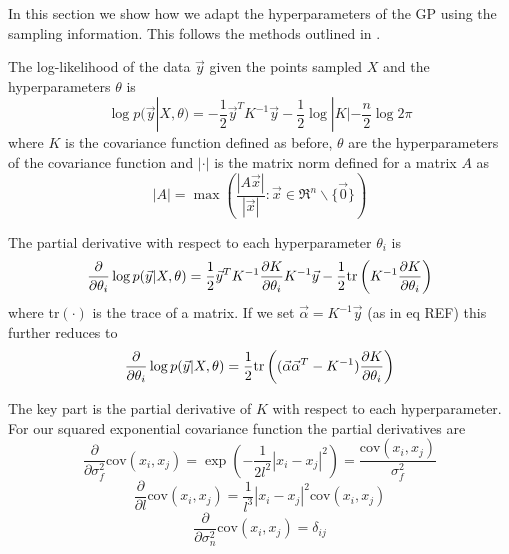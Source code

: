 \documentclass[phd,tocprelim]{cornell}
\begin{document}
In this section we show how we adapt the hyperparameters of the GP using the sampling information. This follows the methods outlined in \cite{RW}.

The log-likelihood of the data $\vec{y}$ given the points sampled $X$ and the hyperparameters $\theta$ is
\begin{equation}
    \log p(\vec{y}|X, \theta) = -\frac{1}{2}\vec{y}^{T}K^{-1}\vec{y} - \frac{1}{2}\log|K| - \frac{n}{2} \log 2\pi
\end{equation}
where $K$ is the covariance function defined as before, $\theta$ are the hyperparameters of the covariance function and $|\cdot|$ is the matrix norm defined for a matrix $A$ as
\begin{equation}
    |A| = \max \left( \frac{|A\vec{x}|}{|\vec{x}|} : \vec{x} \in \Re^{n}\backslash\{\vec{0}\} \right)
\end{equation}

The partial derivative with respect to each hyperparameter $\theta_{i}$ is
\begin{equation}
    \frac{\partial}{\partial \theta_{i}} \log p(\vec{y}|X,\theta) = \frac{1}{2}\vec{y}^{T}K^{-1}\frac{\partial K}{\partial \theta_{i}} K^{-1}\vec{y} - \frac{1}{2} {\rm tr}\left( K^{-1}\frac{\partial K}{\partial \theta_{i}} \right)
\end{equation}
where tr$(\cdot)$ is the trace of a matrix. If we set $\vec{\alpha} = K^{-1}\vec{y}$ (as in eq REF) this further reduces to
\begin{equation}
    \frac{\partial}{\partial \theta_{i}} \log p(\vec{y}|X,\theta) = \frac{1}{2} {\rm tr}\left((\vec{\alpha}\vec{\alpha}^{T} - K^{-1})\frac{\partial K}{\partial \theta_{i}}\right)
\end{equation}

The key part is the partial derivative of $K$ with respect to each hyperparameter. For our squared exponential covariance function the partial derivatives are
\begin{equation}
    \frac{\partial}{\partial \sigma_{f}^{2}} \mbox{cov}(x_{i}, x_{j}) = \exp\left( -\frac{1}{2l^{2}} |x_{i} - x_{j}|^{2}\right) = \frac{\mbox{cov}(x_{i}, x_{j})}{\sigma_{f}^{2}}
\end{equation}
\begin{equation}
    \frac{\partial}{\partial l} \mbox{cov}(x_{i}, x_{j}) = \frac{1}{l^{3}}|x_{i} - x_{j}|^{2}\mbox{cov}(x_{i}, x_{j})
\end{equation}
\begin{equation}
    \frac{\partial}{\partial \sigma_{n}^{2}} \mbox{cov}(x_{i}, x_{j}) = \delta_{ij}
\end{equation}
\end{document}
